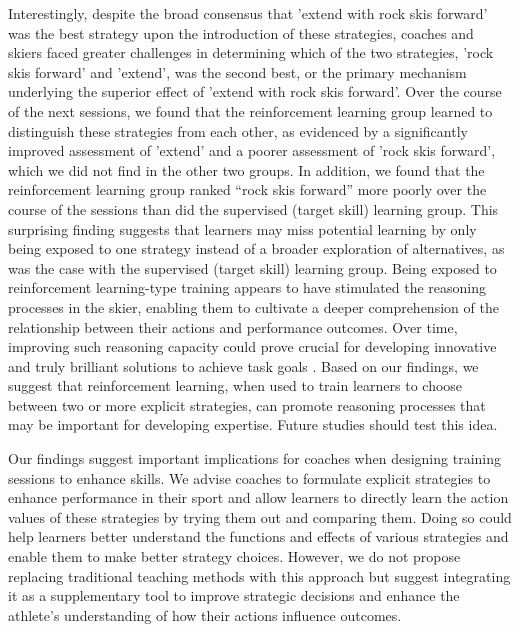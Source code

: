 \documentclass[pdflatex,sn-nature]{sn-jnl}%
\theoremstyle{thmstyleone}%
\theoremstyle{thmstyletwo}%
\theoremstyle{thmstylethree}%
\begin{document}
Interestingly, despite the broad consensus that 'extend with rock skis forward' was the best strategy upon the introduction of these strategies, coaches and skiers faced greater challenges in determining which of the two strategies, 'rock skis forward' and 'extend', was the second best, or the primary mechanism underlying the superior effect of 'extend with rock skis forward'. Over the course of the next sessions, we found that the reinforcement learning group learned to distinguish these strategies from each other, as evidenced by a significantly improved assessment of 'extend' and a poorer assessment of 'rock skis forward', which we did not find in the other two groups. In addition, we found that the reinforcement learning group ranked “rock skis forward” more poorly over the course of the sessions than did the supervised (target skill) learning group. This surprising finding suggests that learners may miss potential learning by only being exposed to one strategy instead of a broader exploration of alternatives, as was the case with the supervised (target skill) learning group. Being exposed to reinforcement learning-type training appears to have stimulated the reasoning processes in the skier, enabling them to cultivate a deeper comprehension of the relationship between their actions and performance outcomes\cite{tsay_strategy_2023}. Over time, improving such reasoning capacity could prove crucial for developing innovative and truly brilliant solutions to achieve task goals  \cite{ericsson_scientific_1998}. Based on our findings, we suggest that reinforcement learning, when used to train learners to choose between two or more explicit strategies, can promote reasoning processes that may be important for developing expertise. Future studies should test this idea.

Our findings suggest important implications for coaches when designing training sessions to enhance skills. We advise coaches to formulate explicit strategies to enhance performance in their sport and allow learners to directly learn the action values of these strategies by trying them out and comparing them. Doing so could help learners better understand the functions and effects of various strategies and enable them to make better strategy choices. However, we do not propose replacing traditional teaching methods with this approach but suggest integrating it as a supplementary tool to improve strategic decisions and enhance the athlete's understanding of how their actions influence outcomes.
\end{document}
